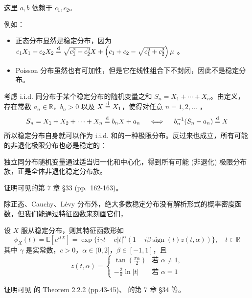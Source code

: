 \begin{remark}
这里 $a,b$ 依赖于 $c_1,c_2$。
\end{remark}

例如：

\begin{itemize}
\tightlist
\item
  正态分布显然是稳定分布，因为 $c_1X_1+c_2X_2\overset{\rm d}=\sqrt{c_1^2+c_2^2}X+\left(c_1+c_2-\sqrt{c_1^2+c_2^2}\right)\mu$ 。
\item
  Poisson 分布虽然也有可加性，但是它在线性组合下不封闭，因此不是稳定分布。
\end{itemize}

考虑 i.i.d. 同分布于某个稳定分布的随机变量之和 $S_n = X_1 + \cdots + X_n$。由定义，存在常数 $a_n \in \mathbb{R}$，$b_n > 0$ 以及 $X \overset{\rm d}{=} X_1$，使得对任意 $n=1,2,\dots$ ， \[ S_n = X_1 + X_2 + \cdots + X_n \overset{\rm d}{=} b_n X + a_n \quad \iff\quad b_n^{-1}(S_n - a_n) \overset{\rm d}{=} X \]所以稳定分布自身就可以作为 i.i.d. 和的一种极限分布。反过来也成立，所有可能的非退化极限分布也必是稳定的：

\begin{theorem}[稳定律的极限性质]
\label{thm:ext-stable:limit-property}

独立同分布随机变量通过适当归一化和中心化，得到所有可能 (非退化) 极限分布族，正是全体非退化稳定分布族。

\end{theorem}
证明可见\cite{gnedenko1954}的第 7 章 §33 (pp.~162-163)。


除正态、Cauchy、Lévy 分布外，绝大多数稳定分布没有解析形式的概率密度函数，但我们能通过特征函数来刻画它们，

\begin{theorem}[稳定律的谱表示]
\label{thm:ext-stable:spectral-representation}

设 $X$ 服从稳定分布，则其特征函数形如
\[\phi_X(t) = \mathbb{E}[e^{itX}] = \exp\big\{i\gamma t - c|t|^{\alpha}(1 - i\beta \operatorname{sign}(t)z(t, \alpha))\big\}, \quad t \in \mathbb{R}\]
其中 $\gamma$ 是实常数，$c > 0$，$\alpha \in (0, 2]$，$\beta \in [-1, 1]$，且\[ z(t, \alpha) = \begin{cases} \tan\left(\frac{\pi\alpha}{2}\right) & \text{若 } \alpha \neq 1, \\ -\frac{2}{\pi} \ln|t| & \text{若 } \alpha = 1\end{cases} \]

\end{theorem}
证明可见 \cite{ibragimov1971} 的 Theorem 2.2.2 (pp.43-45)、\cite{gnedenko1954} 的第 7 章 §34 等。


